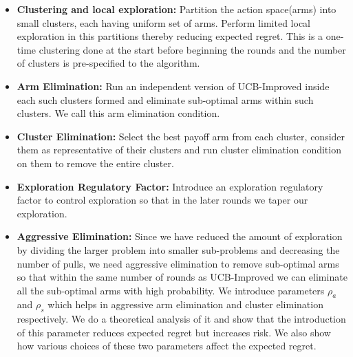 \begin{itemize}
\item \textbf{Clustering and local exploration:} Partition the action space(arms) into small clusters, each having uniform set of arms. Perform limited local exploration in this partitions thereby reducing expected regret. This is a one-time clustering done at the start before beginning the rounds and the number of clusters is pre-specified to the algorithm.
\item \textbf{Arm Elimination:} Run an independent version of UCB-Improved inside each such clusters formed and eliminate sub-optimal arms within such clusters. We call this arm elimination condition.
\item \textbf{Cluster Elimination:} Select the best payoff arm from each cluster, consider them as representative of their clusters and run cluster elimination condition on them to remove the entire cluster.
\item \textbf{Exploration Regulatory Factor:} Introduce an exploration regulatory factor to control exploration so that in the later rounds we taper our exploration.
\item \textbf{Aggressive Elimination:} Since we have reduced the amount of exploration by dividing the larger problem into smaller sub-problems and decreasing the number of pulls, we need aggressive elimination to remove sub-optimal arms so that within the same number of rounds as UCB-Improved we can eliminate all the sub-optimal arms with high probability. We introduce parameters $\rho_{a}$ and $\rho_{s}$ which helps in aggressive arm elimination and cluster elimination respectively. We do a theoretical analysis of it and show that the introduction of this parameter reduces expected regret but increases risk. We also show how various choices of these two parameters affect the expected regret.
\end{itemize}

